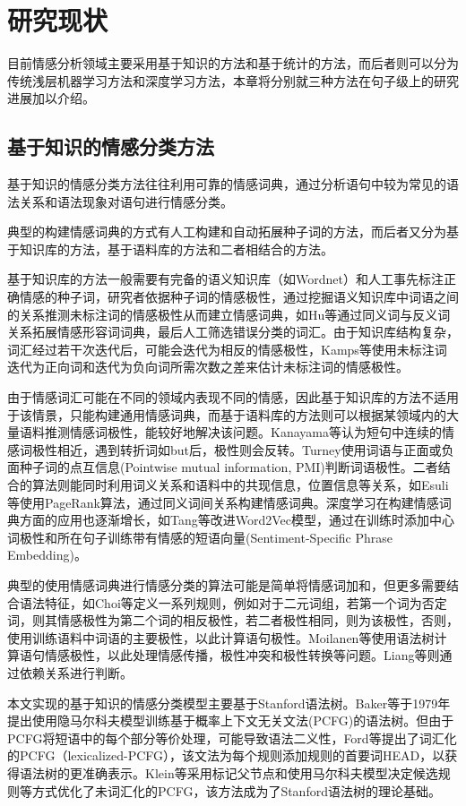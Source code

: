 \section{研究现状}
目前情感分析领域主要采用基于知识的方法和基于统计的方法，而后者则可以分为传统浅层机器学习方法和深度学习方法，本章将分别就三种方法在句子级上的研究进展加以介绍。
\subsection{基于知识的情感分类方法}
基于知识的情感分类方法往往利用可靠的情感词典，通过分析语句中较为常见的语法关系和语法现象对语句进行情感分类。

典型的构建情感词典的方式有人工构建和自动拓展种子词的方法，而后者又分为基于知识库的方法，基于语料库的方法和二者相结合的方法\cite{Wang2016}。

基于知识库的方法一般需要有完备的语义知识库（如Wordnet）和人工事先标注正确情感的种子词，研究者依据种子词的情感极性，通过挖掘语义知识库中词语之间的关系推测未标注词的情感极性从而建立情感词典，如Hu\cite{huliu2004a}等通过同义词与反义词关系拓展情感形容词词典，最后人工筛选错误分类的词汇。由于知识库结构复杂，词汇经过若干次迭代后，可能会迭代为相反的情感极性，Kamps等\cite{Kamps04a}使用未标注词迭代为正向词和迭代为负向词所需次数之差来估计未标注词的情感极性。

由于情感词汇可能在不同的领域内表现不同的情感，因此基于知识库的方法不适用于该情景，只能构建通用情感词典，而基于语料库的方法则可以根据某领域内的大量语料推测情感词极性，能较好地解决该问题。Kanayama等\cite{Kanayama2006}认为短句中连续的情感词极性相近，遇到转折词如but后，极性则会反转。Turney\cite{turneylittman2003}使用词语与正面或负面种子词的点互信息(Pointwise mutual information, PMI)判断词语极性。二者结合的算法则能同时利用词义关系和语料中的共现信息，位置信息等关系，如Esuli\cite{Esuli2007}等使用PageRank算法，通过同义词间关系构建情感词典。深度学习在构建情感词典方面的应用也逐渐增长，如Tang\cite{Tang2014b}等改进Word2Vec模型，通过在训练时添加中心词极性和所在句子训练带有情感的短语向量(Sentiment-Specific Phrase Embedding)。

典型的使用情感词典进行情感分类的算法可能是简单将情感词加和，但更多需要结合语法特征，如Choi等\cite{Choi2008}定义一系列规则，例如对于二元词组，若第一个词为否定词，则其情感极性为第二个词的相反极性，若二者极性相同，则为该极性，否则，使用训练语料中词语的主要极性，以此计算语句极性。Moilanen等\cite{Moilanen2007}使用语法树计算语句情感极性，以此处理情感传播，极性冲突和极性转换等问题。Liang等\cite{Liang2013}则通过依赖关系进行判断。

本文实现的基于知识的情感分类模型主要基于Stanford语法树。Baker等\cite{Baker79}于1979年提出使用隐马尔科夫模型训练基于概率上下文无关文法(PCFG)的语法树。但由于PCFG将短语中的每个部分等价处理，可能导致语法二义性，Ford等\cite{Ford1982}提出了词汇化的PCFG（lexicalized-PCFG），该文法为每个规则添加规则的首要词HEAD，以获得语法树的更准确表示。Klein等\cite{Klein2003}采用标记父节点和使用马尔科夫模型决定候选规则等方式优化了未词汇化的PCFG，该方法成为了Stanford语法树的理论基础。
